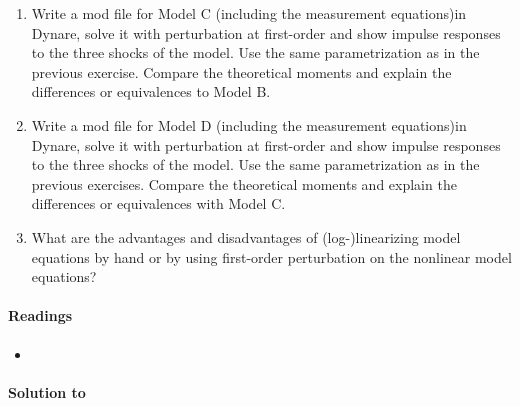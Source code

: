 \begin{enumerate}
\item Write a mod file for Model C (including the measurement equations)in Dynare, solve it with perturbation at first-order
  and show impulse responses to the three shocks of the model.
Use the same parametrization as in the previous exercise.
Compare the theoretical moments and explain the differences or equivalences to Model B.
  
\item Write a mod file for Model D (including the measurement equations)in Dynare, solve it with perturbation at first-order
  and show impulse responses to the three shocks of the model.
Use the same parametrization as in the previous exercises.
Compare the theoretical moments and explain the differences or equivalences with Model C.
  
\item What are the advantages and disadvantages of (log-)linearizing model equations by hand or by using first-order perturbation on the nonlinear model equations?
  
\end{enumerate}

\paragraph{Readings}
\begin{itemize}
	\item \textcite{An.Schorfheide_2007_BayesianAnalysisDSGE}
\end{itemize}

\begin{solution}\textbf{Solution to }
\ifDisplaySolutions

\fi
\newpage
\end{solution}